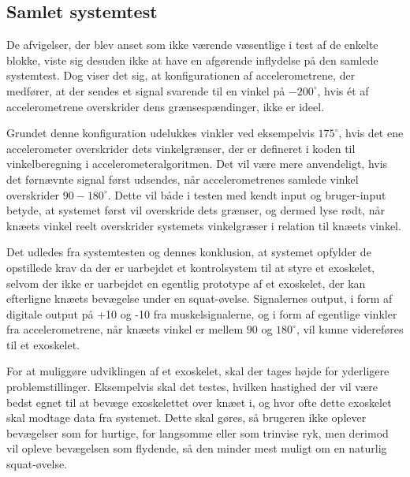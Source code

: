 
\subsection{Samlet systemtest}
De afvigelser, der blev anset som ikke værende væsentlige i test af de enkelte blokke, viste sig desuden ikke at have en afgørende inflydelse på den samlede systemtest. Dog viser det sig, at konfigurationen af accelerometrene, der medfører, at der sendes et signal svarende til en vinkel på $-200^{\circ}$, hvis ét af accelerometrene overskrider dens grænsespændinger, ikke er ideel.

Grundet denne konfiguration udelukkes vinkler ved eksempelvis $175^{\circ}$, hvis det ene accelerometer overskrider dets vinkelgrænser, der er defineret i koden til vinkelberegning i accelerometeralgoritmen. Det vil være mere anvendeligt, hvis det førnævnte signal først udsendes, når accelerometrenes samlede vinkel overskrider $90-180^{\circ}$. Dette vil både i testen med kendt input og bruger-input betyde, at systemet først vil overskride dets grænser, og dermed lyse rødt, når knæets vinkel reelt overskrider systemets vinkelgræser i relation til knæets vinkel.

Det udledes fra systemtesten og dennes konklusion, at systemet opfylder de opstillede krav da der er uarbejdet et kontrolsystem til at styre et exoskelet, selvom der ikke er uarbejdet en egentlig prototype af et exoskelet, der kan efterligne knæets bevægelse under en squat-øvelse. Signalernes output, i form af digitale output på +10 og -10 fra muskelsignalerne, og i form af egentlige vinkler fra accelerometrene, når knæets vinkel er mellem $90$ og $180^{\circ}$, vil kunne videreføres til et exoskelet. 

For at muliggøre udviklingen af et exoskelet, skal der tages højde for yderligere problemstillinger. Eksempelvis skal det testes, hvilken hastighed der vil være bedst egnet til at bevæge exoskelettet over knæet i, og hvor ofte dette exoskelet skal modtage data fra systemet. Dette skal gøres, så brugeren ikke oplever bevægelser som for hurtige, for langsomme eller som trinvise ryk, men derimod vil opleve bevægelsen som flydende, så den minder mest muligt om en naturlig squat-øvelse.





